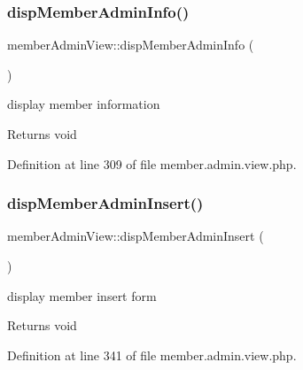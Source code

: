 \hypertarget{classmemberAdminView_a9e87c4fbbb859f2557457b1935453dd4}{}\label{classmemberAdminView_a9e87c4fbbb859f2557457b1935453dd4} 
\subsubsection{\texorpdfstring{disp\+Member\+Admin\+Info()}{dispMemberAdminInfo()}}
{\footnotesize\ttfamily member\+Admin\+View\+::disp\+Member\+Admin\+Info (\begin{DoxyParamCaption}{ }\end{DoxyParamCaption})}

display member information

\begin{DoxyReturn}{Returns}
void 
\end{DoxyReturn}


Definition at line 309 of file member.\+admin.\+view.\+php.

\hypertarget{classmemberAdminView_ad7a3311686a49ab70e318fb66736258a}{}\label{classmemberAdminView_ad7a3311686a49ab70e318fb66736258a} 
\subsubsection{\texorpdfstring{disp\+Member\+Admin\+Insert()}{dispMemberAdminInsert()}}
{\footnotesize\ttfamily member\+Admin\+View\+::disp\+Member\+Admin\+Insert (\begin{DoxyParamCaption}{ }\end{DoxyParamCaption})}

display member insert form

\begin{DoxyReturn}{Returns}
void 
\end{DoxyReturn}


Definition at line 341 of file member.\+admin.\+view.\+php.

\hypertarget{classmemberAdminView_a049d24f5adc0c5eb534902e44944ff08}{}\label{classmemberAdminView_a049d24f5adc0c5eb534902e44944ff08} 
